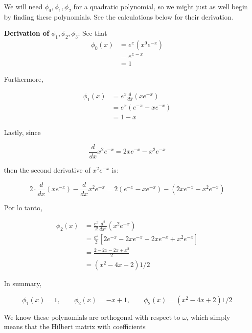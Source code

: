 \documentclass[12pt]{article}
\theoremstyle{definition}
\begin{document}
We will need $\phi_0, \phi_1, \phi_2$ for a quadratic polynomial, so we might
just as well begin by finding these polynomials. See the calculations below 
for their derivation.

\begin{shaded}
    \textbf{Derivation of } $\phi_1, \phi_2, \phi_3$: See that
\begin{align*}
    \phi_0(x) 
    &= e^x(x^0e^{-x}) \\ 
    &=e^{x - x} \\ 
    &= 1
\end{align*}

Furthermore,

\begin{align*}
    \phi_1(x) 
    &= e^x\frac{d}{dx}\left( x e^{-x} \right) \\ 
    &=e^{x} \left( e^{-x} - xe^{-x}  \right)  \\ 
    &=1 - x
\end{align*}

Lastly, since

\begin{equation*}
    \frac{d}{dx}x^2 e^{-x} = 2xe^{-x} - x^2e^{-x}
\end{equation*}

then the second derivative of $x^2e^{-x}$ is:

\begin{equation*}
    2 \cdot \frac{d}{dx}(xe^{-x}) - \frac{d}{dx} x^2e^{-x} = 2\left( e^{-x} -
    xe^{-x} \right) - (2x e^{-x} - x^2e^{-x})
\end{equation*}

Por lo  tanto,

\begin{align*}
    \phi_2(x) 
    &= \frac{e^x}{2!} \frac{d^2}{dx^2}  \left( x^2e^{-x} \right) \\ 
    &= \frac{e^x}{2} \left[ 2e^{-x} - 2xe^{-x} - 2xe^{-x} + x^2e^{-x} \right] \\ 
    &= \frac{ 2 - 2x - 2x + x^2 }{2} \\ 
    &= (x^2 -4x + 2) 1 / 2
\end{align*}
\end{shaded}

In summary, 

\begin{equation*}
    \phi_1(x) = 1,\qquad \phi_2(x) = -x + 1, \qquad \phi_2(x) = (x^2 - 4x + 2) 1
    / 2
\end{equation*}

We know these polynomials are orthogonal with respect to $\omega$, which simply
means that the Hilbert matrix with coefficients
\end{document}
